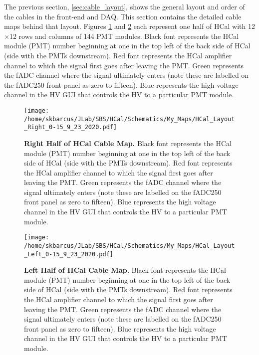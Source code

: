 \documentclass[oneside]{book}   %
\begin{document}
The previous section, \ref{sec:cable_layout}, shows the general layout and order of the cables in the front-end and DAQ. This section contains the detailed cable maps behind that layout. Figures \ref{fig:right_half} and \ref{fig:left_half} each represent one half of HCal with 12$\times$12 rows and columns of 144 PMT modules. Black font represents the HCal module (PMT) number beginning at one in the top left of the back side of HCal (side with the PMTs downstream). Red font represents the HCal amplifier channel to which the signal first goes after leaving the PMT. Green represents the fADC channel where the signal ultimately enters (note these are labelled on the fADC250 front panel as zero to fifteen). Blue represents the high voltage channel in the HV GUI that controls the HV to a particular PMT module.

	\begin{landscape}

	\begin{figure}[!ht]
	\begin{center}
	\texttt{[image: /home/skbarcus/JLab/SBS/HCal/Schematics/My\_Maps/HCal\_Layout\_Right\_0-15\_9\_23\_2020.pdf]}
	\end{center}
	\vspace{-25mm}
	\caption{
	{\bf{Right Half of HCal Cable Map.}} Black font represents the HCal module (PMT) number beginning at one in the top left of the back side of HCal (side with the PMTs downstream). Red font represents the HCal amplifier channel to which the signal first goes after leaving the PMT. Green represents the fADC channel where the signal ultimately enters (note these are labelled on the fADC250 front panel as zero to fifteen). Blue represents the high voltage channel in the HV GUI that controls the HV to a particular PMT module.}
	\label{fig:right_half}
	\end{figure}	
	
	\begin{figure}[!ht]
	\begin{center}
	\texttt{[image: /home/skbarcus/JLab/SBS/HCal/Schematics/My\_Maps/HCal\_Layout\_Left\_0-15\_9\_23\_2020.pdf]}
	\end{center}
	\vspace{-25mm}
	\caption{
	{\bf{Left Half of HCal Cable Map.}} Black font represents the HCal module (PMT) number beginning at one in the top left of the back side of HCal (side with the PMTs downstream). Red font represents the HCal amplifier channel to which the signal first goes after leaving the PMT. Green represents the fADC channel where the signal ultimately enters (note these are labelled on the fADC250 front panel as zero to fifteen). Blue represents the high voltage channel in the HV GUI that controls the HV to a particular PMT module.}
	\label{fig:left_half}
	\end{figure}	
	
	\end{landscape}
	\restoregeometry
\end{document}
